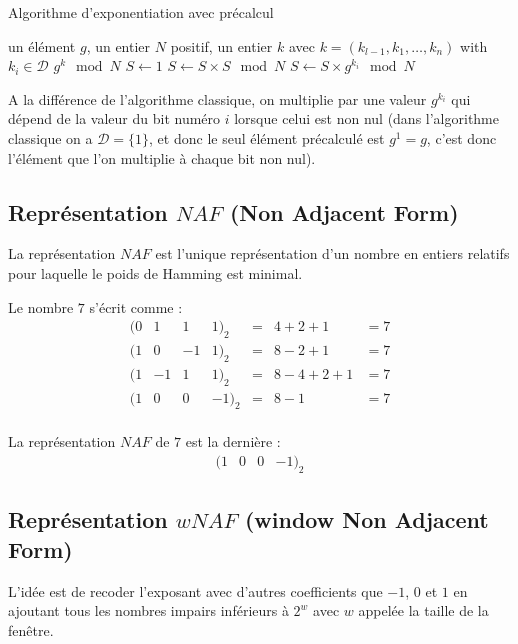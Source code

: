 \documentclass[12pt, a4paper]{memoir}
\begin{document}
\begin{algorithm}
 \caption{Algorithme d'exponentiation avec précalcul}
 \begin{algorithmic}
  \REQUIRE un élément $g$, un entier $N$ positif, un entier $k$ avec $k = (k_{l-1},k_1,\ldots,k_n)$ with $k_i \in \mathcal{D}$
  \ENSURE $g^k \mod N$
  \STATE $S \leftarrow 1$
  \STATE $S \leftarrow S \times S \mod N$
  \STATE $S \leftarrow S \times g^{k_i} \mod N$
  \ENDIF
  \ENDFOR
 \end{algorithmic}
\end{algorithm}

A la différence de l'algorithme classique, on multiplie par une valeur $g^{k_i}$ qui dépend de la valeur 
du bit numéro $i$ lorsque celui est non nul (dans l'algorithme classique on a $\mathcal{D} = \{1\}$, et donc 
le seul élément précalculé est $g^1 = g$, c'est donc l'élément que l'on multiplie à chaque bit non nul).

\subsection{Représentation $NAF$ (Non Adjacent Form)}
La représentation $NAF$ est l'unique représentation d'un nombre en entiers relatifs pour laquelle le poids de Hamming est minimal.

\begin{Exemple}
 Le nombre $7$ s'écrit comme :
 $$\begin{array}{ccccccc}
  (0 & 1 & 1 & 1)_2 & = & 4 + 2 + 1 & = 7 \\
  (1 & 0 & -1 & 1)_2 & = & 8 - 2 + 1 & = 7 \\
  (1 & -1 & 1 & 1)_2 & = & 8 - 4 + 2 + 1 & = 7 \\
  (1 & 0 & 0 & -1)_2 & = & 8 - 1 & = 7 \\
 \end{array}$$
 
 La représentation $NAF$ de $7$ est la dernière : $$\begin{array}{cccc} (1 & 0 & 0 & -1)_2 \end{array}$$
\end{Exemple}

\subsection{Représentation $wNAF$ (window Non Adjacent Form)}

L'idée est de recoder l'exposant avec d'autres coefficients que $-1$, $0$ et $1$ en ajoutant tous les nombres 
impairs inférieurs à $2^w$ avec $w$ appelée la taille de la fenêtre.
\end{document}
